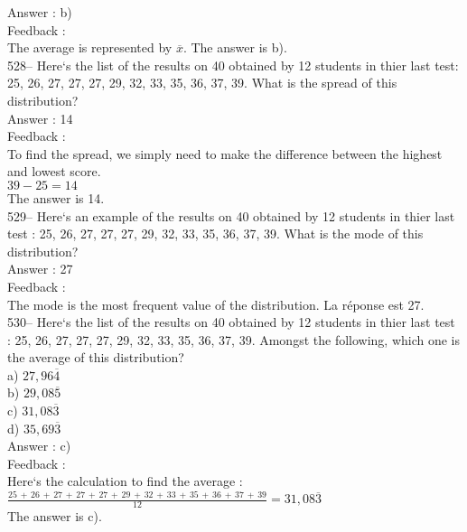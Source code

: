 \documentclass[letterpaper, 12pt]{article}
\begin{document}
Answer : b)\\

Feedback : \\
The average is represented by $\overline{x}$.  The answer is b).\\

528-- Here`s the list of the results on 40 obtained by 12 students in thier last test: 25, 26, 27, 27, 27, 29, 32, 33, 35, 36, 37, 39.  What is the spread of this distribution?\\

Answer : 14\\

Feedback : \\
To find the spread, we simply need to make the difference between the highest and lowest score. \\
$39-25=14$\\
The answer is 14.\\

529-- Here`s an example of the results on 40 obtained by 12 students in thier last test : 25, 26, 27, 27, 27, 29, 32, 33, 35, 36, 37, 39. What is the mode of this distribution?\\

Answer : 27\\

Feedback : \\
The mode is the most frequent value of the distribution.  La
r\'eponse est 27.\\

530-- Here`s the list of the results on 40 obtained by 12 students in thier last test : 25, 26, 27, 27, 27, 29, 32, 33, 35, 36, 37, 39. Amongst the following, which one is the average of this distribution?\\
a) $27,96\overline{4}$\\
b) $29,08\overline{5}$\\
c) $31,08\overline{3}$\\
d) $35,69\overline{3}$\\

Answer : c) \\

Feedback : \\
Here`s the calculation to find the average :\\[2mm]
$\frac{25\,+\,26\,+\,27\,+\,27\,+\,27\,+\,29\,+\,32\,+\,33\,+\,35\,+\,36\,+\,37\,+\,39}{12}=31,08\overline{3}$\\[2mm]
The answer is c).\\
\end{document}

